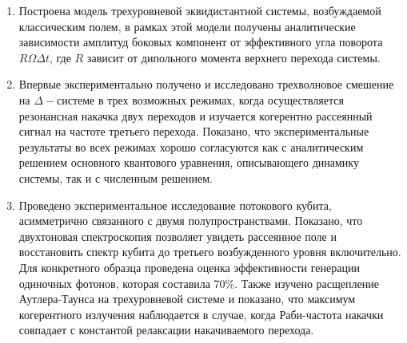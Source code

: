 \begin{enumerate}
  \item Построена модель трехуровневой эквидистантной системы, возбуждаемой классическим полем, в рамках этой модели получены аналитические зависимости амплитуд боковых компонент от эффективного угла поворота $R\Omega \Delta t$, где $R$ зависит от дипольного момента верхнего перехода системы. 
  \item Впервые экспериментально получено и исследовано трехволновое смешение на $\Delta-$системе в трех возможных режимах, когда осуществляется резонансная накачка двух переходов и изучается когерентно рассеянный сигнал на частоте третьего перехода. Показано, что экспериментальные результаты во всех режимах хорошо согласуются как с аналитическим решением основного квантового уравнения, описывающего динамику системы, так и с численным решением.  
  \item Проведено экспериментальное исследование потокового кубита, асимметрично связанного с двумя полупространствами. Показано, что двухтоновая спектроскопия позволяет увидеть рассеянное поле и восстановить спектр кубита до третьего возбужденного уровня включительно. Для конкретного образца проведена оценка эффективности генерации одиночных фотонов, которая составила 70\%. Также изучено расщепление Аутлера-Таунса на трехуровневой системе и показано, что максимум когерентного излучения наблюдается в случае, когда Раби-частота накачки совпадает с константой релаксации накачиваемого перехода.
\end{enumerate}
